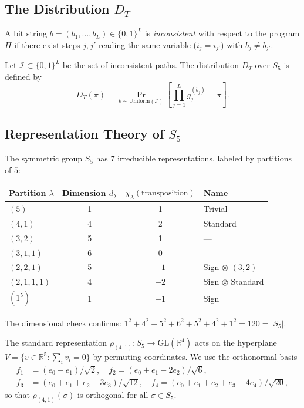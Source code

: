 \documentclass[version=submission]{iacrcc}
\begin{document}
\subsection{The Distribution $D_T$}

\begin{definition}
A bit string $b = (b_1, \ldots, b_L) \in \{0,1\}^L$ is \emph{inconsistent}
with respect to the program $\Pi$ if there exist steps $j, j'$ reading the
same variable ($i_j = i_{j'}$) with $b_j \neq b_{j'}$.
\end{definition}

\begin{definition}[$D_T$]
Let $\mathcal{I} \subset \{0,1\}^L$ be the set of inconsistent paths.
The distribution $D_T$ over $S_5$ is defined by
\[
D_T(\pi) = \Pr_{b \sim \mathrm{Uniform}(\mathcal{I})}
\left[ \prod_{j=1}^{L} g_j^{(b_j)} = \pi \right].
\]
\end{definition}


\subsection{Representation Theory of $S_5$}

The symmetric group $S_5$ has $7$ irreducible representations, labeled by
partitions of $5$:

\begin{center}
\begin{tabular}{lccl}
\toprule
Partition $\lambda$ & Dimension $d_\lambda$ & $\chi_\lambda(\text{transposition})$ & Name \\
\midrule
$(5)$       & 1 & 1 & Trivial \\
$(4,1)$     & 4 & 2 & Standard \\
$(3,2)$     & 5 & 1 & --- \\
$(3,1,1)$   & 6 & 0 & --- \\
$(2,2,1)$   & 5 & $-1$ & Sign $\otimes$ $(3,2)$ \\
$(2,1,1,1)$ & 4 & $-2$ & Sign $\otimes$ Standard \\
$(1^5)$     & 1 & $-1$ & Sign \\
\bottomrule
\end{tabular}
\end{center}

The dimensional check confirms: $1^2 + 4^2 + 5^2 + 6^2 + 5^2 + 4^2 + 1^2 = 120 = |S_5|$.

\begin{definition}
The standard representation $\rho_{(4,1)} : S_5 \to \mathrm{GL}(\mathbb{R}^4)$
acts on the hyperplane $V = \{v \in \mathbb{R}^5 : \sum_i v_i = 0\}$ by
permuting coordinates. We use the orthonormal basis
\begin{align*}
f_1 &= (e_0 - e_1)/\sqrt{2}, \quad
f_2 = (e_0 + e_1 - 2e_2)/\sqrt{6}, \\
f_3 &= (e_0 + e_1 + e_2 - 3e_3)/\sqrt{12}, \quad
f_4 = (e_0 + e_1 + e_2 + e_3 - 4e_4)/\sqrt{20},
\end{align*}
so that $\rho_{(4,1)}(\sigma)$ is orthogonal for all $\sigma \in S_5$.
\end{definition}
\end{document}
